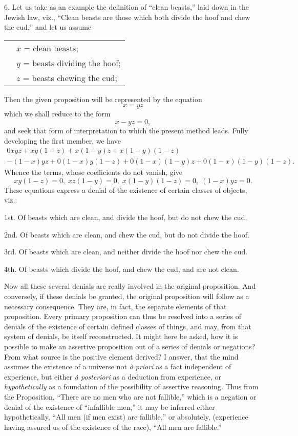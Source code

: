 \documentclass[oneside]{book}
\begin{document}
6. Let us take as an example the definition of ``clean beasts,''
laid down in the Jewish law, viz., ``Clean beasts are those
which both divide the hoof and chew the cud,'' and let us assume\\
\begin{tabular}{c l}
&$x$ = clean beasts;\\
&$y$ = beasts dividing the hoof;\\
&$z$ = beasts chewing the cud;
\end{tabular}
Then the given proposition will be represented by the equation
\[
x = yz
\]
which we shall reduce to the form
\[
x - yz = 0,
\]
and seek that form of interpretation to which the present method
leads. Fully developing the first member, we have
\begin{eqnarray*}
0xyz + xy\left(1-z\right) + x\left(1-y\right)z + x\left(1-y\right)\left(1-z\right)\\
- \left(1-x\right)yz + 0\left(1-x\right)y\left(1-z\right) + 0\left(1-x\right)\left(1-y\right)z + 0\left(1-x\right)\left(1-y\right)\left(1-z\right).
\end{eqnarray*}
Whence the terms, whose coefficients do not vanish, give
\[
xy\left(1-z\right) = 0,\; xz\left(1-y\right) = 0,\; x\left(1-y\right)\left(1-z\right) = 0,\; \left(1-x\right)yz = 0.
\]
These equations express a denial of the existence of certain classes
of objects, viz.:

1st. Of beasts which are clean, and divide the hoof, but do
not chew the cud.

2nd. Of beasts which are clean, and chew the cud, but do not
divide the hoof.

3rd. Of beasts which are clean, and neither divide the hoof
nor chew the cud.

4th. Of beasts which divide the hoof, and chew the cud, and
are not clean.

Now all these several denials are really involved in the original
proposition. And conversely, if these denials be granted,
the original proposition will follow as a necessary consequence.
They are, in fact, the separate elements of that proposition.
Every primary proposition can thus be resolved into a series of
denials of the existence of certain defined classes of things, and
may, from that system of denials, be itself reconstructed. It
might here be asked, how it is possible to make an assertive proposition
out of a series of denials or negations? From what
source is the positive element derived? I answer, that the mind
assumes the existence of a universe not  \textit{\`{a} priori} as a fact independent
of experience, but either \textit{\`{a} posteriori} as a deduction
from experience, or \textit{hypothetically} as a foundation of the possibility
of assertive reasoning. Thus from the Proposition, ``There
are no men who are not fallible,'' which is a negation or denial of
the existence of ``infallible men,'' it may be inferred either hypothetically,
``All men (if men exist) are fallible,'' or absolutely,
(experience having assured us of the existence of the race), ``All
men are fallible.''
\end{document}
